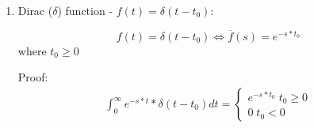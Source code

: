 \documentclass[10pt,a4paper]{article}
\begin{document}
\begin{enumerate}
     \item Dirac ($\delta$) function - $f(t)=\delta(t-t_0)$:
     \begin{tcolorbox}[breakable,colback=white,colframe=black,width=\dimexpr\textwidth+12mm\relax,enlarge left by=-6mm]
        \begin{equation*} 
        f(t)=\delta(t-t_0) \Leftrightarrow \overline{f}(s)=e^{-s*t_0}
        \end{equation*}
        where $t_0 \geq 0$
     \end{tcolorbox}
     Proof: 
     \begin{equation*} 
        \begin{aligned}
            \int_{0}^{\infty}e^{-s*t}*\delta(t-t_0) dt = \begin{cases}
                e^{-s*t_0}\; t_0\geq 0 \\
                0\; t_0<0
            \end{cases} 
        \end{aligned}
     \end{equation*}
 \end{enumerate}

 \pagebreak
\end{document}
